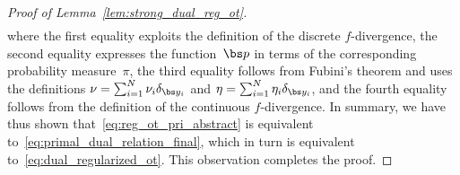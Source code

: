 \documentclass[11pt, a4paper, oneside, reqno]{article}
\begin{document}
\begin{proof}[Proof of Lemma~\ref{lem:strong_dual_reg_ot}]
\begin{align*}
		\end{align*}
		where the first equality exploits the definition of the discrete $f$-divergence, the second equality expresses the function~$\bs p$ in terms of the corresponding probability measure~$\pi$, the third equality follows from Fubini's theorem and uses the definitions $\nu=\sum_{i=1}^N \nu_i\delta_{\bs y_i}$ and $\eta=\sum_{i=1}^N \eta_i\delta_{\bs y_i}$, and the fourth equality follows from the definition of the continuous $f$-divergence. In summary, we have thus shown that~\eqref{eq:reg_ot_pri_abstract} is equivalent to~\eqref{eq:primal_dual_relation_final}, which in turn is equivalent to~\eqref{eq:dual_regularized_ot}. This observation completes the proof.

\end{proof}
\end{document}
